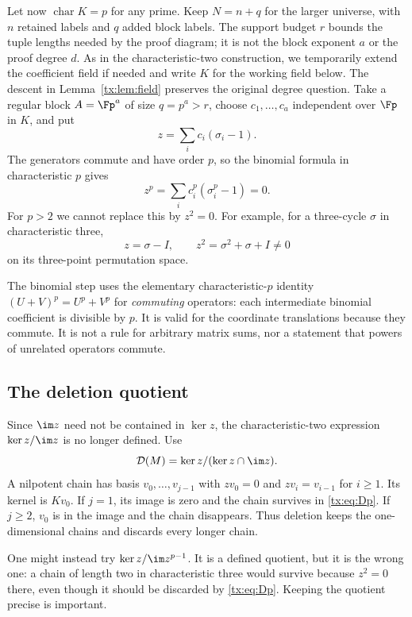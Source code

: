 \documentclass[11pt,a4paper,oneside,openany]{book}
\theoremstyle{definition}\newtheorem{definition}[theorem]{Definition}
\theoremstyle{remark}\newtheorem{remark}[theorem]{Remark}
\newcommand{\D}{\mathcal D}\newcommand{\Del}{\mathcal D}\newcommand{\Lift}{\mathsf L}
\numberwithin{equation}{chapter}
\begin{document}
Let now $\operatorname{char}K=p$ for any prime. Keep $N=n+q$ for the larger universe, with $n$ retained labels and $q$ added block labels. The support budget $r$ bounds the tuple lengths needed by the proof diagram; it is not the block exponent $a$ or the proof degree $d$.
As in the characteristic-two construction, we temporarily extend the
coefficient field if needed and write $K$ for the working field below.
The descent in Lemma~\ref{tx:lem:field} preserves the original degree
question. Take a regular block $A=\Fp^a$ of size $q=p^a>r$, choose
$c_1,\ldots,c_a$ independent over $\Fp$ in $K$, and put
\[z=\sum_i c_i(\sigma_i-1).
\]
The generators commute and have order $p$, so the binomial formula in characteristic $p$ gives
\[z^p=\sum_i c_i^p(\sigma_i^p-1)=0.
\]
For $p>2$ we cannot replace this by $z^2=0$. For example, for a three-cycle $\sigma$ in characteristic three,
\[z=\sigma-I,\qquad z^2=\sigma^2+\sigma+I\ne0
\]
on its three-point permutation space.

The binomial step uses the elementary characteristic-$p$ identity
$(U+V)^p=U^p+V^p$ for \emph{commuting} operators: each intermediate
binomial coefficient is divisible by $p$. It is valid for the coordinate
translations because they commute. It is not a rule for arbitrary
matrix sums, nor a statement that powers of unrelated operators commute.

\subsection{The deletion quotient}
Since $\im z$ need not be contained in $\ker z$, the characteristic-two expression $\ker z/\im z$ is no longer defined. Use
\begin{equation}\label{tx:eq:Dp}
\D(M)=\ker z/(\ker z\cap\im z).
\end{equation}
A nilpotent chain has basis $v_0,\ldots,v_{j-1}$ with $zv_0=0$ and $zv_i=v_{i-1}$ for $i\ge1$. Its kernel is $Kv_0$. If $j=1$, its image is zero and the chain survives in \eqref{tx:eq:Dp}. If $j\ge2$, $v_0$ is in the image and the chain disappears. Thus deletion keeps the one-dimensional chains and discards every longer chain.

One might instead try $\ker z/\im z^{p-1}$. It is a defined quotient, but it is the wrong one: a chain of length two in characteristic three would survive because $z^2=0$ there, even though it should be discarded by \eqref{tx:eq:Dp}. Keeping the quotient precise is important.
\end{document}
